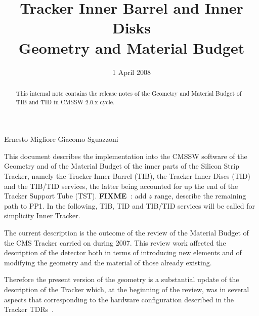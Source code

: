 \documentclass{cmspaper}
\begin{document}
\def \mrad      {{\rm \, mrad}}
\newcommand {\cm}         {\rm   cm}
\newcommand {\mm}         {\rm   mm}
\newcommand {\m}          {\rm   m}

\renewcommand{\labelenumi}{\alph{enumi})}
\newcommand{\fixme}{{\bf FIXME~}}



\begin{titlepage}

   \date{1 April 2008}

  \title{Tracker Inner Barrel and Inner Disks\\
  Geometry and Material Budget}

  \begin{Authlist}
    Ernesto Migliore
    Giacomo Sguazzoni
  \end{Authlist}

 
  \begin{abstract}
This internal note contains the release notes of the Geometry and
Material Budget of TIB and TID in CMSSW 2.0.x cycle. 
  \end{abstract} 

\end{titlepage}

\setcounter{page}{2}%

This document describes the implementation into the CMSSW software of
the Geometry and of the Material Budget of the inner parts of the
Silicon Strip Tracker, namely the Tracker Inner Barrel (TIB), the
Tracker Inner Discs (TID) and the TIB/TID services, the
latter being accounted for up the end of the Tracker Support Tube (TST).
\fixme: add $z$ range, describe the remaining path to PP1.
In the following, TIB, TID and TIB/TID services will be called for
simplicity Inner Tracker.

The current description is the outcome of the review of the Material
Budget of the CMS Tracker carried on during 2007. This review work
affected the description of the detector both in terms of introducing
new elements and of modifying the geometry and the material of those
already existing.

Therefore the present version of the geometry is a substantial update of the description
of the Tracker which, at the beginning of the review, was in several
aspects that corresponding to the hardware configuration described in the Tracker TDRs~\cite{tdr}.
\end{document}
